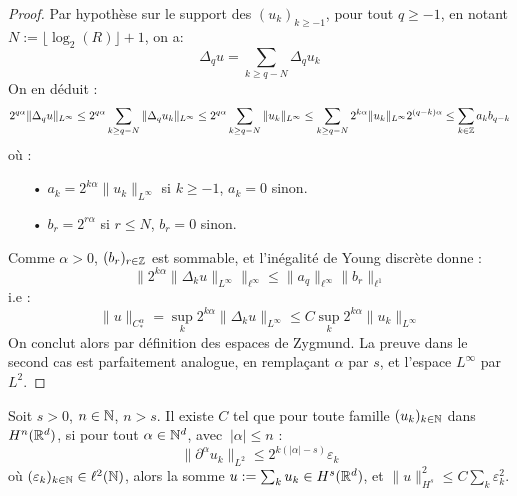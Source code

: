 \documentclass[11pt,a4paper]{article}
\begin{document}
\begin{proof}
Par hypothèse sur le support des $(u_k)_{k\geq -1}$, pour tout $q \geq -1$,  en notant $N := \lfloor\log_2(R) \rfloor + 1$, on a: 
\begin{equation*}
\Delta_q u = \sum_{k\geq q-N} \Delta_qu_k
\end{equation*}
On en déduit :
\begin{equation*}
2^{q\alpha}\|\Delta_qu\|_{L^\infty}\leq  2^{q\alpha}\sum_{k\geq q-N}\|\Delta_qu_k\|_{L^\infty} \leq 2^{q\alpha}\sum_{k\geq q-N}\|u_k\|_{L^\infty} \leq \sum_{k\geq q-N} 2^{k\alpha}\|u_k\|_{L^\infty} 2^{(q-k)\alpha} \leq \sum_{k\in \mathbb Z} a_k b_{q-k}
\end{equation*}
où :
\begin{itemize}
\item[•] $a_k =  2^{k\alpha}\|u_k\|_{L^\infty}$ si $k\geq -1$, $a_k = 0$ sinon.
\item[•] $b_r =  2^{r\alpha}$ si $r\leq N$, $b_r = 0$ sinon.
\end{itemize}
Comme $\alpha>0$, $(b_r)_{r\in \mathbb Z}$ est sommable, et l'inégalité de Young discrète donne :
\begin{equation*}
\|2^{k\alpha}\|\Delta_ku\|_{L^\infty}\|_{\ell^\infty} \leq \|a_q\|_{\ell^\infty} \|b_r\|_{\ell^1}
\end{equation*}
i.e :
\begin{equation*}
\|u\|_{C^\alpha_*} = \sup_k 2^{k\alpha}\|\Delta_ku\|_{L^\infty} \leq C\sup_k 2^{k\alpha}\|u_k\|_{L^\infty} 
\end{equation*}
On conclut alors par définition des espaces de Zygmund. La preuve dans le second cas est parfaitement analogue, en remplaçant $\alpha$ par $s$, et l'espace $L^\infty$ par $L^2$.
\end{proof}


\begin{prop}[]\label{meyer}
Soit $s>0$, $n\in \mathbb N$, $n>s$. Il existe $C$ tel que pour toute famille $(u_k)_{k\in \mathbb N}$ dans $H^n(\mathbb R^d)$, si pour tout $\alpha \in \mathbb N^d$, avec $\ |\alpha| \leq n $ :
\begin{equation*}
\|\partial ^\alpha u_k \|_{L^2} \leq 2^{k(|\alpha|-s)}\varepsilon_k
\end{equation*}
où $(\varepsilon_k)_{k\in \mathbb N} \in \ell^2(\mathbb N)$, alors la somme $u:=\sum_k u_k \in H^s(\mathbb R^d) $, et $ \|u\|_{H^s}^2 \leq C \sum_k \varepsilon_k^2 $.
\end{prop}
\end{document}
